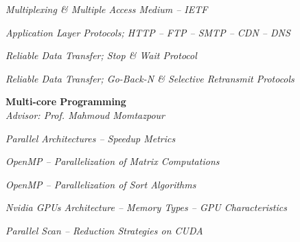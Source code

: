\documentclass[margin, 10pt]{res} %
\begin{document}
\begin{resume}
\begin{innerlist}
			\item \textit{Multiplexing \& Multiple Access Medium -- IETF} \href{https://github.com/aligholamee/Compnets/raw/master/docs/assignment-5/compnet_assignment_5_9531504.pdf}{\hfill\UrlFont[docs]}
			
			\item \textit{Application Layer Protocols; HTTP -- FTP -- SMTP -- CDN -- DNS} \href{https://github.com/aligholamee/Compnets/raw/master/docs/assignment-6/compnet_assignment_6_9531504.pdf}{\hfill\UrlFont[docs]}
			
			
			\item \textit{Reliable Data Transfer; Stop \& Wait Protocol} \href{https://github.com/aligholamee/Compnets/raw/master/docs/assignment-8/compnet_assignment_8_9531504.pdf}{\hfill\UrlFont[docs]}
			
			\item \textit{Reliable Data Transfer; Go-Back-N \& Selective Retransmit Protocols} \href{https://github.com/aligholamee/Compnets/raw/master/docs/assignment-9/compnet_assignment_9_9531504.pdf}{\hfill\UrlFont[docs]}
		\end{innerlist}
	
        \textbf{Multi-core Programming}\\
			\textit{Advisor: Prof. Mahmoud Momtazpour}
			\begin{innerlist}
				\item \textit{Parallel Architectures -- Speedup Metrics} \href{https://github.com/aligholamee/Parallax/raw/master/docs/assignment-1/MCP_9531504_HW1.pdf}{\hfill\UrlFont[docs]}
				
				\item \textit{OpenMP -- Parallelization of Matrix Computations} \href{https://github.com/aligholamee/Parallax/raw/master/docs/assignment-2/MCP_9531504_HW2.pdf}{\hfill\UrlFont[docs]}
				
				\item \textit{OpenMP -- Parallelization of Sort Algorithms} \href{https://github.com/aligholamee/Parallax/raw/master/docs/assignment-3/MCP_9531504_HW3.pdf}{\hfill\UrlFont[docs]}

				\item \textit{Nvidia GPUs Architecture -- Memory Types -- GPU Characteristics} \href{https://github.com/aligholamee/Parallax/raw/master/docs/assignment-4/MCP_9531504_HW4.pdf}{\hfill\UrlFont[docs]}

				\item \textit{Parallel Scan -- Reduction Strategies on CUDA} \href{https://github.com/aligholamee/Parallax/raw/master/docs/assignment-5/MCP_9531504_HW5.pdf}{\hfill\UrlFont[docs]}
				

\end{innerlist}
\end{resume}
\end{document}
